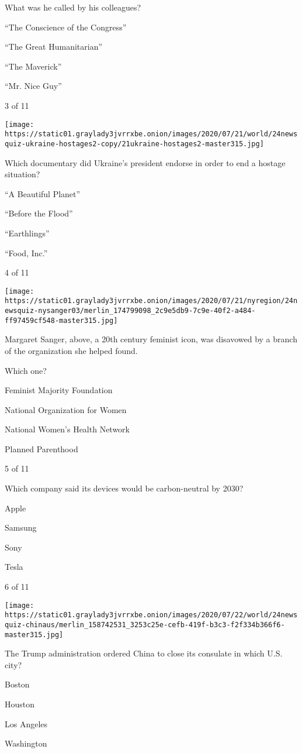 What was he called by his colleagues?

``The Conscience of the Congress''

``The Great Humanitarian''

``The Maverick''

``Mr. Nice Guy''

3 of 11

\texttt{[image: https://static01.graylady3jvrrxbe.onion/images/2020/07/21/world/24newsquiz-ukraine-hostages2-copy/21ukraine-hostages2-master315.jpg]}

Which documentary did Ukraine's president endorse in order to end a
hostage situation?

``A Beautiful Planet''

``Before the Flood''

``Earthlings''

``Food, Inc.''

4 of 11

\texttt{[image: https://static01.graylady3jvrrxbe.onion/images/2020/07/21/nyregion/24newsquiz-nysanger03/merlin\_174799098\_2c9e5db9-7c9e-40f2-a484-ff97459cf548-master315.jpg]}

Margaret Sanger, above, a 20th century feminist icon, was disavowed by a
branch of the organization she helped found.

Which one?

Feminist Majority Foundation

National Organization for Women

National Women's Health Network

Planned Parenthood

5 of 11

Which company said its devices would be carbon-neutral by 2030?

Apple

Samsung

Sony

Tesla

6 of 11

\texttt{[image: https://static01.graylady3jvrrxbe.onion/images/2020/07/22/world/24newsquiz-chinaus/merlin\_158742531\_3253c25e-cefb-419f-b3c3-f2f334b366f6-master315.jpg]}

The Trump administration ordered China to close its consulate in which
U.S. city?

Boston

Houston

Los Angeles

Washington

